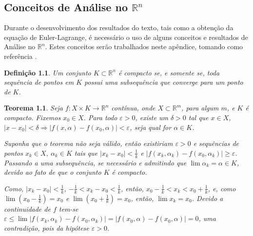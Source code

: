 \documentclass[
	12pt,				%
	openright,			%
    twoside,			%
	a4paper,			%
	english,			%
	french,				%
	spanish,			%
	brazil				%
	]{abntex2}
\makeatletter
\newtheorem{teorema}{Teorema}
\newtheorem{definicao}{Definição}
\renewenvironment{proof}[1][\proofname]{
	\par\pushQED{\qed}%
	\normalfont \topsep6\p@\@plus6\p@\relax
	\trivlist
	\item\relax
		{\itshape
			#1\@addpunct{.}}\hspace\labelsep\ignorespaces
}{%
	\popQED\endtrivlist\@endpefalse
}
\numberwithin{lema}{chapter}
\numberwithin{teorema}{chapter}
\numberwithin{definicao}{chapter}
\numberwithin{exemplo}{chapter}
\numberwithin{figure}{chapter}
\makeatother
\begin{document}

\begin{apendicesenv}

\partapendices

\chapter{Conceitos de Análise no $\mathbb{R}^n$}
\label{apend:regra_de_leibniz}
{
	Durante o desenvolvimento dos resultados do texto, tais como a obtenção da equação de Euler-Lagrange, é necessário o uso de alguns conceitos e resultados de Análise no $\mathbb{R}^n$. Estes conceitos serão trabalhados neste apêndice, tomando como referência .

	\begin{definicao}
		Um conjunto $K\subset \mathbb{R}^n$ é compacto se, e somente se, toda sequência de pontos em $K$ possui uma subsequência que converge para um ponto de $K$.
	\end{definicao}

	\begin{teorema}
		\label{teorema:func_uniformemente}
		Seja $f:X\times K \longrightarrow \mathbb{R}^n$ contínua, onde $X\subset \mathbb{R}^m$, para algum $m$, e $K$ é compacto. Fixemos $x_0 \in X$. Para todo $\varepsilon > 0$, existe um $\delta > 0$ tal que $x\in X$, $|x-x_0|<\delta \Longrightarrow |f(x, \alpha)-f(x_0,\alpha)|<\varepsilon$, seja qual for $\alpha \in K$.
		\begin{proof}
		Suponha que o teorema não seja válido, então existiriam $\varepsilon > 0$ e sequências de pontos $x_k\in X$, $\alpha_k \in K$ tais que $|x_k-x_0|<\frac{1}{k}$ e $|f(x_k,\alpha_k)-f(x_0,\alpha_k)|\geqslant \varepsilon$. Passando a uma subsequência, se necessário e admitindo que $\lim \alpha_k=\alpha \in K$, devido ao fato de que o conjunto $K$ é compacto.
		
		Como, $|x_k-x_0|<\frac{1}{k}$, $-\frac{1}{k}<x_k-x_0<\frac{1}{k}$, então, $x_0-\frac{1}{k}<x_k<x_0+\frac{1}{k}$, e, como $\lim \left (x_0-\frac{1}{k} \right ) = x_0$ e $\lim \left ( x_0 + \frac{1}{k} \right )=x_0$, então, $\lim x_k=x_0$. Devido a continuidade de $f$ tem-se $\varepsilon \leqslant \lim |f(x_k,\alpha_k)-f(x_0,\alpha _k)|=|f(x_0,\alpha)-f(x_0,\alpha)|=0$, uma contradição, pois da hipótese $\varepsilon >0$.
		\end{proof}
	\end{teorema}
	
}
\end{apendicesenv}
\end{document}
